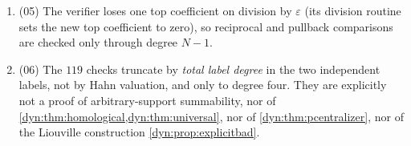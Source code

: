 \documentclass[11pt,letterpaper]{article}
\theoremstyle{definition}
\theoremstyle{remark}
\newcommand{\eps}{\varepsilon}
\numberwithin{equation}{section}
\begin{document}
\begin{enumerate}[label=\textbf{N\arabic*.},leftmargin=3.2em,start=63]
existence, the classification, or the slow-time theorem.
\textbf{Fifty of its $245$ assertions are finite lexicographic
illustrations for $n=1,\dots,50$; the all-$n$ inequality is proved in the
text, not inferred from them.}
\item (05) The verifier loses one top coefficient on division by $\eps$
(its division routine sets the new top coefficient to zero), so
reciprocal and pullback comparisons are checked only through degree $N-1$.
\item (06) The $119$ checks truncate by \emph{total label degree} in the
two independent labels, not by Hahn valuation, and only to degree four.
They are explicitly not a proof of arbitrary-support summability, nor of
\cref{dyn:thm:homological,dyn:thm:universal}, nor of
\cref{dyn:thm:pcentralizer}, nor of the Liouville construction
\cref{dyn:prop:explicitbad}.
\end{enumerate}
\end{document}
